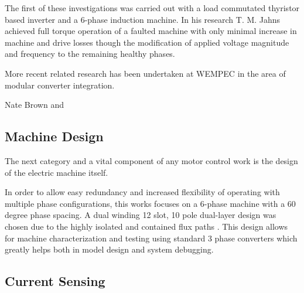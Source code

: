 The first of these investigations was carried out with a load commutated
thyristor based inverter and a 6-phase induction machine.
In his research \cite{Jahns78} T. M. Jahns achieved full torque operation of a faulted
machine with only minimal increase in machine and drive losses though the
modification of applied voltage magnitude and frequency to the remaining
healthy phases.

More recent related research has been undertaken at WEMPEC in the area of
modular converter integration.

Nate Brown and 


\subsection{Machine Design}
The next category and a vital component of any motor control work is the
design of the electric machine itself.

In order to allow easy redundancy and increased flexibility of operating with
multiple phase configurations, this works focuses on a 6-phase machine with a
60 degree phase spacing.
A dual winding 12 slot, 10 pole dual-layer design was chosen due to the
highly isolated and contained flux paths \cite{Bianchi05}.
This design allows for machine characterization and testing using standard 3
phase converters which greatly helps both in model design and system
debugging.


\subsection{Current Sensing}

